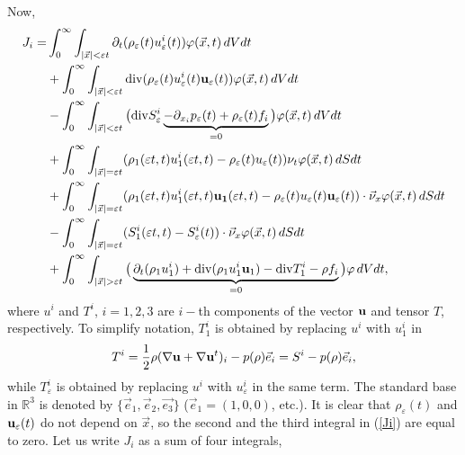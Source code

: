\documentclass[reqno]{article}%
\theoremstyle{plain}
\theoremstyle{definition}
\theoremstyle{remark}
\renewcommand{\div}{{\rm div} }
\numberwithin{equation}{section}
\begin{document}
\noindent
Now, 
\begin{equation}\label{Ji}
\begin{split}
J_i =&\int_0^\infty\int_{|\vec{x}|< \varepsilon t} \partial_t(\rho_\varepsilon(t) u^i_\varepsilon(t))\varphi(\vec{x},t)\,dVdt\\
&+ \int_0^\infty\int_{|\vec{x}|< \varepsilon t} \div(\rho_\varepsilon(t)u^i_\varepsilon(t){\bf u}_\varepsilon(t))\varphi(\vec{x},t)\,dVdt\\
&-\int_0^\infty\int_{|\vec{x}|< \varepsilon t} \big(\div S_\varepsilon^i\underbrace{- \partial_{x_i}p_\varepsilon(t)+\rho_\varepsilon(t)  f_i}_{=0}\big) \varphi(\vec{x},t)\,dV dt\\
&+\int_0^\infty\int_{|\vec{x}|= \varepsilon t} (\rho_1(\varepsilon t,t)u_1^i(\varepsilon t,t)-\rho_\varepsilon(t)u_\varepsilon(t))\nu_t \varphi(\vec{x},t)\,dSdt\\
&+\int_0^\infty\int_{|\vec{x}|= \varepsilon t} (\rho_1(\varepsilon t,t)u_1^i(\varepsilon t,t){\bf u_1}(\varepsilon t,t)-\rho_\varepsilon(t)u_\varepsilon(t){\bf u}_\varepsilon(t))\cdot \vec{\nu}_x \varphi(\vec{x},t)\,dSdt\\
&- \int_0^\infty\int_{|\vec{x}|= \varepsilon t} (S^i_1(\varepsilon t,t)-S^i_\varepsilon(t))\cdot\vec{\nu}_x \varphi(\vec{x},t)\,dSdt\\
&+ \int_0^\infty\int_{|\vec{x}|>\varepsilon t}\big(\underbrace{\partial_t(\rho_1u_1^i)+\div(\rho_1u_1^i{\bf u}_1)-\div T^i_1-\rho f_i}_{=0}\big)\varphi\,dVdt,
\end{split}
\end{equation}
where $u^i$ and $T^i$, $i=1,2,3$ are $i-$th components of the vector ${\bf u}$ and tensor $T$, respectively. To simplify notation, $T_1^i$ is obtained by replacing $u^i$ with $u_1^i$ in 
\[T^i=\frac{1}{2}\rho(\nabla {\bf u}+\nabla {\bf u}^t)_i-p(\rho)\vec{e}_i=S^i-p(\rho)\vec{e}_i,\]
while $T_\varepsilon^i$ is obtained by replacing $u^i$ with $u_\varepsilon^i$ in the same term. The standard base in $\mathbb{R}^3$ is denoted by $\{\vec{e}_1,\vec{e}_2,\vec{e_3}\}$  ($\vec{e}_1=(1,0,0)$, etc.). It is clear that $\rho_\varepsilon(t)$ and ${\bf u}_\varepsilon(t)$ do not depend on $\vec{x}$, so the second and the third integral in (\ref{Ji}) are equal to zero. Let us write $J_i$ as a sum of four integrals,
\end{document}
